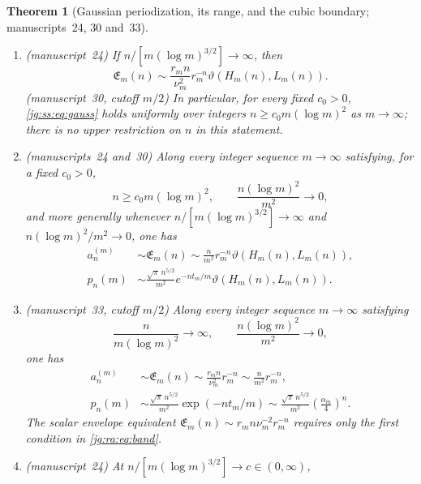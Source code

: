 \documentclass[11pt,a4paper]{article}
\newtheorem{theorem}{Theorem}[section]
\theoremstyle{definition}\newaliascnt{definition}{theorem}
\theoremstyle{remark}\newaliascnt{remark}{theorem}
\begin{document}
\begin{theorem}[Gaussian periodization, its range, and the cubic boundary;
manuscripts~24, 30 and~33]\label{jg:ss:thm:cubic}
\leavevmode
\begin{enumerate}
\item[(i)] \emph{(manuscript~24)} If $n/[m(\log m)^{3/2}]\to\infty$, then
 \begin{equation}\label{jg:ss:eq:gauss}
  \mathfrak E_m(n)\sim\frac{r_m n}{\nu_m^2}r_m^{-n}
             \vartheta(H_m(n),L_m(n)).
 \end{equation}
 \emph{(manuscript~30, cutoff $m/2$)} In particular, for every fixed
 $c_0>0$, \eqref{jg:ss:eq:gauss} holds uniformly over integers
 $n\ge c_0m(\log m)^2$ as $m\to\infty$; there is no upper restriction on $n$
 in this statement.
\item[(ii)] \emph{(manuscripts~24 and~30)} Along every integer sequence
 $m\to\infty$ satisfying, for a fixed $c_0>0$,
 \begin{equation}\label{jg:tb:eq:range}
  n\ge c_0m(\log m)^2,
  \qquad \frac{n(\log m)^2}{m^2}\longrightarrow0,
 \end{equation}
 and more generally whenever $n/[m(\log m)^{3/2}]\to\infty$ and
 $n(\log m)^2/m^2\to0$, one has
 \begin{align}
  a_n^{(m)}&\sim\mathfrak E_m(n)\sim
        \frac n{m^2}r_m^{-n}\vartheta(H_m(n),L_m(n)),\label{jg:tb:eq:count}\\
  p_n(m)&\sim\frac{\sqrt\pi\,n^{5/2}}{m^2}
       e^{-nt_m/m}\vartheta(H_m(n),L_m(n)).\label{jg:tb:eq:prob}
 \end{align}
\item[(iii)] \emph{(manuscript~33, cutoff $m/2$)} Along every integer sequence
 $m\to\infty$ satisfying
 \begin{equation}\label{jg:ra:eq:band}
  \frac{n}{m(\log m)^2}\longrightarrow\infty,
  \qquad
  \frac{n(\log m)^2}{m^2}\longrightarrow0,
 \end{equation}
 one has
 \begin{align}
  a_n^{(m)}
  &\sim\mathfrak E_m(n)
  \sim \frac{r_m n}{\nu_m^2}r_m^{-n}
  \sim \frac n{m^2}r_m^{-n},\label{jg:ra:eq:counts}\\
  p_n(m)
  &\sim \frac{\sqrt\pi\,n^{5/2}}{m^2}\exp(-nt_m/m)
  \sim \frac{\sqrt\pi\,n^{5/2}}{m^2}\left(\frac{\alpha_m}{4}\right)^n.\label{jg:ra:eq:prob}
 \end{align}
 The scalar envelope equivalent
 $\mathfrak E_m(n)\sim r_mn\nu_m^{-2}r_m^{-n}$ requires only the first condition
 in \eqref{jg:ra:eq:band}.
\item[(iv)] \emph{(manuscript~24)} At $n/[m(\log m)^{3/2}]\to c\in(0,\infty)$,

\end{enumerate}
\end{theorem}
\end{document}
